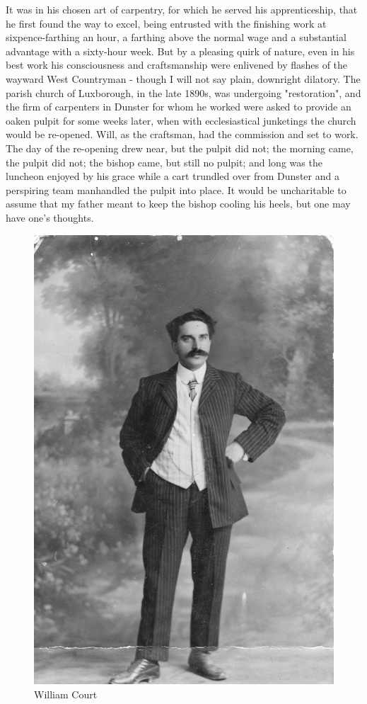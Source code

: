 It was in his chosen art of carpentry, for which he served his apprenticeship, that he first found the way to excel, being entrusted with the finishing work at sixpence-farthing an hour, a farthing above the normal wage and a substantial advantage with a sixty-hour week. But by a pleasing quirk of nature, even in his best work his consciousness and craftsmanship were enlivened by flashes of the wayward West Countryman - though I will not say plain, downright dilatory. The parish church of Luxborough, in the late 1890s, was undergoing "restoration", and the firm of carpenters in Dunster for whom he worked were asked to provide an oaken pulpit for some weeks later, when with ecclesiastical junketings the church would be re-opened. Will, as the craftsman, had the commission and set to work. The day of the re-opening drew near, but the pulpit did not; the morning came, the pulpit did not; the bishop came, but still no pulpit; and long was the luncheon enjoyed by his grace while a cart trundled over from Dunster and a perspiring team manhandled the pulpit into place. It would be uncharitable to assume that my father meant to keep the bishop cooling his heels, but one may have one’s thoughts.

\begin{figure}
	\centering
     \includegraphics[width=1\textwidth]{figures/WilliamCourt}
     \caption{William Court}
     \label{fig:WilliamCourt}
\end{figure}

